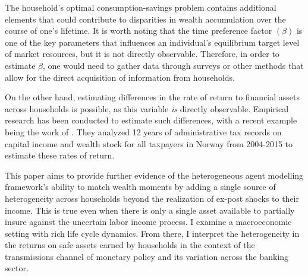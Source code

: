 \par The household's optimal consumption-savings problem contains additional elements that could contribute to disparities in wealth accumulation over the course of one's lifetime. It is worth noting that the time preference factor $(\beta)$ is one of the key parameters that influences an individual's equilibrium target level of market resources, but it is not directly observable. Therefore, in order to estimate $\beta$, one would need to gather data through surveys or other methods that allow for the direct acquisition of information from households.

\par On the other hand, estimating differences in the rate of return to financial assets across households is possible, as this variable \textit{is} directly observable. Empirical research has been conducted to estimate such differences, with a recent example being the work of \cite{aflgdmlp20}. They analyzed 12 years of administrative tax records on capital income and wealth stock for all taxpayers in Norway from 2004-2015 to estimate these rates of return.


\par This paper aims to provide further evidence of the heterogeneous agent modelling framework's ability to match wealth moments by adding a single source of heterogeneity across households beyond the realization of ex-post shocks to their income. This is true even when there is only a single asset available to partially insure against the uncertain labor income process. I examine a macroeconomic setting with rich life cycle dynamics. From there, I interpret the heterogeneity in the returns on safe assets earned by households in the context of the transmissions channel of monetary policy and its variation across the banking sector. 